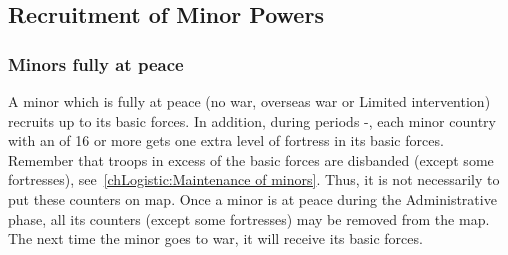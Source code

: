 



\subsection{Recruitment of Minor Powers}
\label{chLogistic:Recruitment of minors}
\subsubsection{Minors fully at peace}
\aparag A minor which is fully at peace (no war, overseas war or Limited
intervention) recruits up to its basic forces.
\bparag In addition, during periods -, each minor
country with an  of 16 or more gets one extra level of fortress
in its basic forces.
\bparag Remember that troops in excess of the basic forces are disbanded
(except some fortresses), see~\ref{chLogistic:Maintenance of minors}.
\bparag Thus, it is not necessarily to put these counters on map. Once a minor
is at peace during the Administrative phase, all its counters (except some
fortresses) may be removed from the map. The next time the minor goes to war,
it will receive its basic forces.

